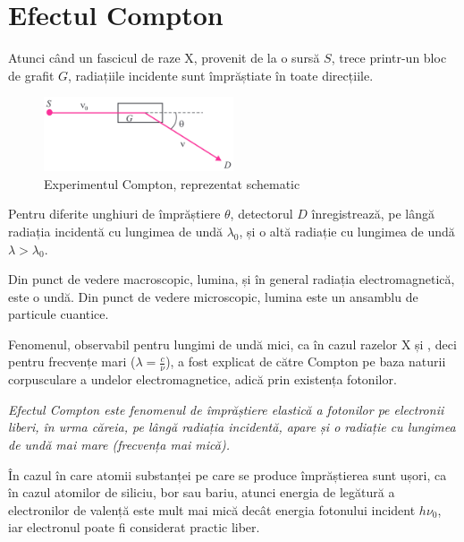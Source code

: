 \section{Efectul Compton}

Atunci când un fascicul de raze X, provenit de la o sursă $S$, trece printr-un
bloc de grafit $G$, radiațiile incidente sunt împrăștiate în toate direcțiile.

\begin{figure}
    \includegraphics[width=0.5\textwidth]{fig/compton}
    \caption{Experimentul Compton, reprezentat schematic}
\end{figure}

Pentru diferite unghiuri de împrăștiere $\theta$, detectorul $D$ înregistrează,
pe lângă radiația incidentă cu lungimea de undă $\lambda_0$, și o altă radiație
cu lungimea de undă \( \lambda > \lambda_0 \).

Din punct de vedere macroscopic, lumina, și în general radiația electromagnetică,
este o undă. Din punct de vedere microscopic, lumina este un ansamblu de particule
cuantice.

\parbreak

Fenomenul, observabil pentru lungimi de undă mici, ca în cazul razelor X și
\gamma, deci pentru frecvențe mari (\(\lambda = \frac{c}{\nu} \)), a fost
explicat de către Compton pe baza naturii corpusculare a undelor electromagnetice,
adică prin existența fotonilor.

\emph{%
    Efectul Compton este fenomenul de împrăștiere elastică a fotonilor pe
    electronii liberi, în urma căreia, pe lângă radiația incidentă, apare și
    o radiație cu lungimea de undă mai mare (frecvența mai mică).
}

În cazul în care atomii substanței pe care se produce împrăștierea sunt ușori,
ca în cazul atomilor de siliciu, bor sau bariu, atunci energia de legătură a
electronilor de valență este mult mai mică decât energia fotonului incident
$h\nu_0$, iar electronul poate fi considerat practic liber.
